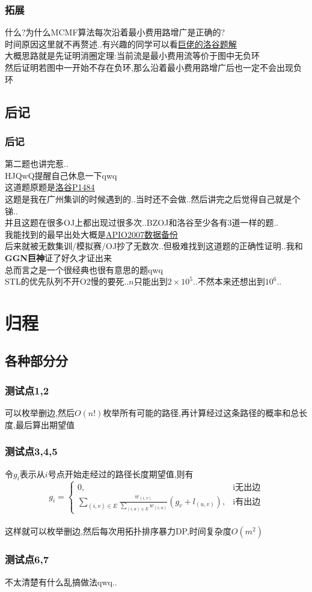 \documentclass{beamer}
\begin{document}
			\begin{frame}\frametitle{拓展}
				什么?为什么MCMF算法每次沿着最小费用路增广是正确的?\\
				时间原因这里就不再赘述..有兴趣的同学可以看\underline{\href{https://www.luogu.com.cn/blog/Bartholomew/solution-p3381}{巨佬的洛谷题解}}\\
				大概思路就是先证明消圈定理:当前流是最小费用流等价于图中无负环\\
				然后证明若图中一开始不存在负环,那么沿着最小费用路增广后也一定不会出现负环
			\end{frame}
		\subsection{后记}
			\begin{frame}\frametitle{后记}
				第二题也讲完惹..\\
				HJQwQ提醒自己休息一下qwq\\
				这道题原题是\underline{\href{https://www.luogu.com.cn/problem/P1484}{洛谷P1484}}\\
				这题是我在广州集训的时候遇到的..当时还不会做..然后讲完之后觉得自己就是个锑..\\
				并且这题在很多OJ上都出现过很多次..BZOJ和洛谷至少各有3道一样的题..\\
				我能找到的最早出处大概是\underline{\href{https://www.luogu.com.cn/problem/P3620}{APIO2007数据备份}}\\
				后来就被无数集训/模拟赛/OJ抄了无数次..但极难找到这道题的正确性证明..我和\textbf{GGN巨神}证了好久才证出来\\
				总而言之是一个很经典也很有意思的题qwq\\
				STL的优先队列不开O2慢的要死..$n$只能出到$2\times10^5$..不然本来还想出到$10^6$..
			\end{frame}
	\section{归程}
		\subsection{各种部分分}
			\begin{frame}\frametitle{测试点1,2}
				可以枚举删边,然后$O(n!)$枚举所有可能的路径,再计算经过这条路径的概率和总长度,最后算出期望值\\
			\end{frame}
			\begin{frame}\frametitle{测试点3,4,5}
				令$g_i$表示从$i$号点开始走经过的路径长度期望值,则有\\
				$$g_i=\begin{cases}
					0,&\mbox{i无出边}\\
					\sum\limits_{(i,v)\in E}\frac{w_{(i,v)}}{\sum\limits_{(i,u)\in E}w_{(i,u)}}(g_v+l_{(u,v)}),&\mbox{i有出边}
				\end{cases}$$\\
				这样就可以枚举删边,然后每次用拓扑排序暴力DP,时间复杂度$O(m^2)$
			\end{frame}
			\begin{frame}\frametitle{测试点6,7}
				不太清楚有什么乱搞做法qwq..
			\end{frame}
\end{document}
